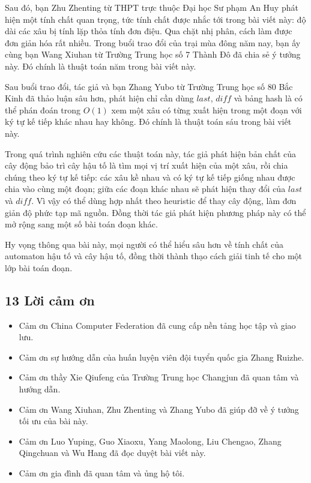 \documentclass[11pt]{article}
\begin{document}
Sau đó, bạn Zhu Zhenting từ THPT trực thuộc Đại học Sư phạm An Huy phát hiện
một tính chất quan trọng, tức tính chất được nhắc tới trong bài viết này: độ dài
các xâu bị tính lặp thỏa tính đơn điệu. Qua chặt nhị phân, cách làm được đơn
giản hóa rất nhiều. Trong buổi trao đổi của trại mùa đông năm nay, bạn ấy cùng
bạn Wang Xiuhan từ Trường Trung học số 7 Thành Đô đã chia sẻ ý tưởng này. Đó
chính là thuật toán năm trong bài viết này.

Sau buổi trao đổi, tác giả và bạn Zhang Yubo từ Trường Trung học số 80 Bắc Kinh
đã thảo luận sâu hơn, phát hiện chỉ cần dùng \(last\), \(diff\) và bảng hash là
có thể phán đoán trong \(O(1)\) xem một xâu có từng xuất hiện trong một đoạn với
ký tự kế tiếp khác nhau hay không. Đó chính là thuật toán sáu trong bài viết
này.

Trong quá trình nghiên cứu các thuật toán này, tác giả phát hiện bản chất của
cây động bảo trì cây hậu tố là tìm mọi vị trí xuất hiện của một xâu, rồi chia
chúng theo ký tự kế tiếp: các xâu kề nhau và có ký tự kế tiếp giống nhau được
chia vào cùng một đoạn; giữa các đoạn khác nhau sẽ phát hiện thay đổi của
\(last\) và \(diff\). Vì vậy có thể dùng hợp nhất theo heuristic để thay cây
động, làm đơn giản độ phức tạp mã nguồn. Đồng thời tác giả phát hiện phương
pháp này có thể mở rộng sang một số bài toán đoạn khác.

Hy vọng thông qua bài này, mọi người có thể hiểu sâu hơn về tính chất của
automaton hậu tố và cây hậu tố, đồng thời thành thạo cách giải tinh tế cho một
lớp bài toán đoạn.

\subsection*{13 Lời cảm ơn}

\begin{itemize}
  \item Cảm ơn China Computer Federation đã cung cấp nền tảng học tập và giao
  lưu.
  \item Cảm ơn sự hướng dẫn của huấn luyện viên đội tuyển quốc gia Zhang
  Ruizhe.
  \item Cảm ơn thầy Xie Qiufeng của Trường Trung học Changjun đã quan tâm và
  hướng dẫn.
  \item Cảm ơn Wang Xiuhan, Zhu Zhenting và Zhang Yubo đã giúp đỡ về ý tưởng
  tối ưu của bài này.
  \item Cảm ơn Luo Yuping, Guo Xiaoxu, Yang Maolong, Liu Chengao, Zhang
  Qingchuan và Wu Hang đã đọc duyệt bài viết này.
  \item Cảm ơn gia đình đã quan tâm và ủng hộ tôi.
\end{itemize}
\end{document}

